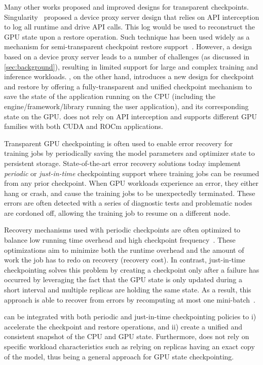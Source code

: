 Many other works proposed and improved designs for transparent checkpoints. Singularity~\cite{shukla2022singularity} proposed a device proxy server design that relies on API interception to log all runtime and drive API calls. This log would be used to reconstruct the GPU state upon a restore operation. Such technique has been used widely as a mechanism for semi-transparent checkpoint restore support~\cite{chaudhary2020balancing,gupta2024just}. However, a design based on a device proxy server leads to a number of challenges (as discussed in \autoref{sec:background}), resulting in limited support for large and complex training and inference workloads. \sys, on the other hand, introduces a new design for checkpoint and restore by offering a fully-transparent and unified checkpoint mechanism to save the state of the application running on the CPU (including the engine/framework/library running the user application), and its corresponding state on the GPU. \sys does not rely on API interception and supports different GPU families with both CUDA and ROCm applications.

 Transparent GPU checkpointing is often used to enable error recovery for training jobs by periodically saving the model parameters and optimizer state to persistent storage. State-of-the-art error recovery solutions today implement \textit{periodic} or \textit{just-in-time} checkpointing support where training jobs can be resumed from any prior checkpoint. When GPU workloads experience an error, they either hang or crash, and cause the training jobs to be unexpectedly terminated. These errors are often detected with a series of diagnostic tests and problematic nodes are cordoned off, allowing the training job to resume on a different node.

Recovery mechanisms used with periodic checkpoints are often optimized to balance low running time overhead and high checkpoint frequency~\cite{mohan2021checkfreq}. These optimizations aim to minimize both the runtime overhead and the amount of work the job has to redo on recovery (recovery cost).
%
In contrast, just-in-time checkpointing solves this problem by creating a checkpoint only after a failure has occurred by leveraging the fact that the GPU state is only updated during a short interval and multiple replicas are holding the same state. As a result, this approach is able to recover from errors by recomputing at most one mini-batch~\cite{gupta2024just}.

\sys can be integrated with both periodic and just-in-time checkpointing policies to i) accelerate the checkpoint and restore operations, and ii) create a unified and consistent snapshot of the CPU and GPU state. Furthermore, \sys does not rely on specific workload characteristics such as relying on replicas having an exact copy of the model, thus being a general approach for GPU state checkpointing.

